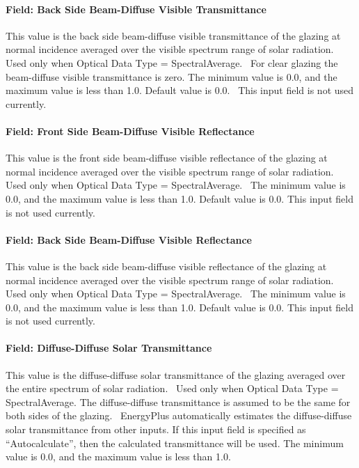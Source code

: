 \paragraph{Field: Back Side Beam-Diffuse Visible Transmittance}\label{field-back-side-beam-diffuse-visible-transmittance}

This value is the back side beam-diffuse visible transmittance of the glazing at normal incidence averaged over the visible spectrum range of solar radiation.~ Used only when Optical Data Type = SpectralAverage.~ For clear glazing the beam-diffuse visible transmittance is zero. The minimum value is 0.0, and the maximum value is less than 1.0. Default value is 0.0.~ This input field is not used currently.

\paragraph{Field: Front Side Beam-Diffuse Visible Reflectance}\label{field-front-side-beam-diffuse-visible-reflectance}

This value is the front side beam-diffuse visible reflectance of the glazing at normal incidence averaged over the visible spectrum range of solar radiation.~ Used only when Optical Data Type = SpectralAverage.~ The minimum value is 0.0, and the maximum value is less than 1.0. Default value is 0.0. This input field is not used currently.

\paragraph{Field: Back Side Beam-Diffuse Visible Reflectance}\label{field-back-side-beam-diffuse-visible-reflectance}

This value is the back side beam-diffuse visible reflectance of the glazing at normal incidence averaged over the visible spectrum range of solar radiation.~ Used only when Optical Data Type = SpectralAverage.~ The minimum value is 0.0, and the maximum value is less than 1.0. Default value is 0.0. This input field is not used currently.

\paragraph{Field: Diffuse-Diffuse Solar Transmittance}\label{field-diffuse-diffuse-solar-transmittance}

This value is the diffuse-diffuse solar transmittance of the glazing averaged over the entire spectrum of solar radiation.~ Used only when Optical Data Type = SpectralAverage. The diffuse-diffuse transmittance is assumed to be the same for both sides of the glazing.~ EnergyPlus automatically estimates the diffuse-diffuse solar transmittance from other inputs. If this input field is specified as ``Autocalculate'', then the calculated transmittance will be used. The minimum value is 0.0, and the maximum value is less than 1.0.

